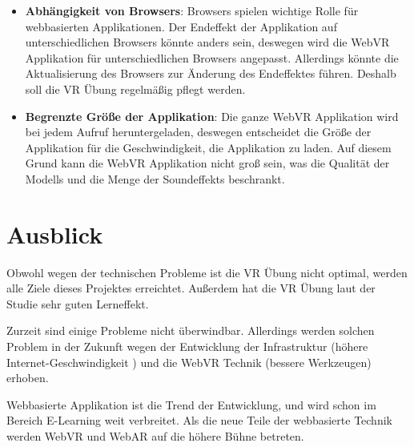 \begin{itemize}
    \item \textbf{Abhängigkeit von Browsers}: Browsers spielen wichtige Rolle für webbasierten Applikationen. Der Endeffekt der Applikation auf unterschiedlichen Browsers könnte anders sein, deswegen wird die WebVR Applikation für unterschiedlichen Browsers angepasst. Allerdings könnte die Aktualisierung des Browsers zur Änderung des Endeffektes führen. Deshalb soll die VR Übung regelmäßig pflegt werden.
    
    \item \textbf{Begrenzte Größe der Applikation}: Die ganze WebVR Applikation wird bei jedem Aufruf heruntergeladen, deswegen entscheidet die Größe der Applikation für die Geschwindigkeit, die Applikation zu laden. Auf diesem Grund kann die WebVR Applikation nicht groß sein, was die Qualität der Modells und die Menge der Soundeffekts beschrankt.
\end{itemize}

\section{Ausblick}

Obwohl wegen der technischen Probleme ist die VR Übung nicht optimal, werden alle Ziele dieses Projektes erreichtet. Außerdem hat die VR Übung laut der Studie sehr guten Lerneffekt.

Zurzeit sind einige Probleme nicht überwindbar. Allerdings werden solchen Problem in der Zukunft wegen der Entwicklung der Infrastruktur (höhere Internet-Geschwindigkeit ) und die WebVR Technik (bessere Werkzeugen) erhoben.

Webbasierte Applikation ist die Trend der Entwicklung, und wird schon im Bereich E-Learning weit verbreitet. Als die neue Teile der webbasierte Technik werden WebVR und WebAR auf die höhere Bühne betreten. 


